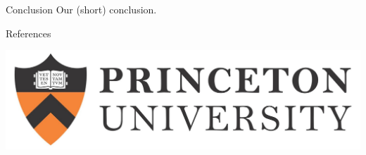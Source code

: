 \documentclass[final]{beamer}
\newlength{\onecolwid}
\begin{document}
\begin{frame}[t]
\begin{columns}[t]
\begin{column}{\onecolwid}
\begin{block}{Conclusion}
Our (short) conclusion.

\end{block}



\begin{block}{References}




\end{block}

\begin{center}
\includegraphics[width=0.5\linewidth]{PU-long.jpg}
\end{center}


\end{column} %

\end{columns} %

\end{frame} %
\end{document}
